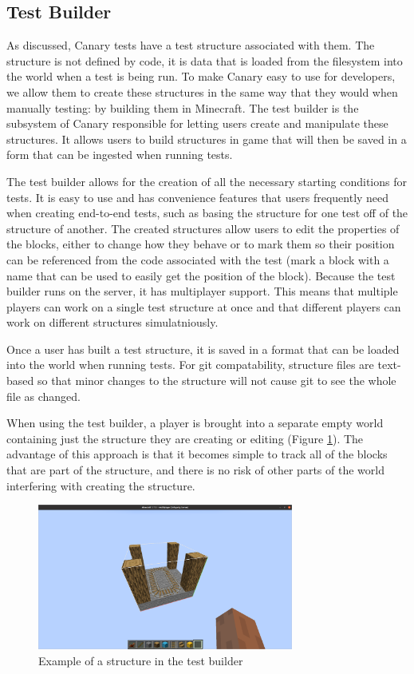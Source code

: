 \documentclass[12pt]{article}
\begin{document}
\begin{onehalfspacing}
\subsection{Test Builder}

As discussed, Canary tests have a test structure associated with them.
The structure is not defined by code, it is data that is loaded from the
filesystem into the world when a test is being run. To make Canary easy
to use for developers, we allow them to create these structures in the
same way that they would when manually testing: by building them in
Minecraft. The test builder is the subsystem of Canary responsible for
letting users create and manipulate these structures. It allows users to
build structures in game that will then be saved in a form that can be
ingested when running tests.

The test builder allows for the creation of all the necessary starting
conditions for tests. It is easy to use and has convenience features
that users frequently need when creating end-to-end tests, such as
basing the structure for one test off of the structure of another. The
created structures allow users to edit the properties of the blocks,
either to change how they behave or to mark them so their position can
be referenced from the code associated with the test (mark a block with
a name that can be used to easily get the position of the block).
Because the test builder runs on the server, it has multiplayer support.
This means that multiple players can work on a single test structure at
once and that different players can work on different structures
simulatniously.

Once a user has built a test structure, it is saved in a format that can
be loaded into the world when running tests. For git compatability,
structure files are text-based so that minor changes to the structure
will not cause git to see the whole file as changed.

When using the test builder, a player is brought into a separate empty
world containing just the structure they are creating or editing (Figure
\ref{fig:4_1_1}). The advantage of this approach is that it becomes simple to
track all of the blocks that are part of the structure, and there is no
risk of other parts of the world interfering with creating the
structure.
\begin{figure}[H] 
    \centering
    \includegraphics[width=0.75\textwidth]{media/media/image9.png} 
    \caption{Example of a structure in the test builder} 
    \label{fig:4_1_1}  
\end{figure}


\end{onehalfspacing}
\end{document}
